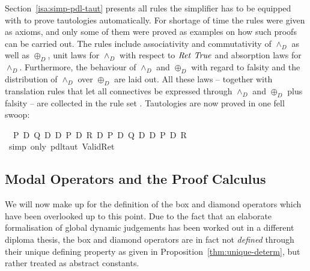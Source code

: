 Section~\ref{isa:simp-pdl-taut} presents all rules the simplifier has to be
equipped with to prove tautologies automatically. For shortage of time the rules
were given as axioms, and only some of them were proved as examples on how such
proofs can be carried out. The rules include associativity and commutativity of
$\land_D$ as well as $\oplus_D$, unit laws for $\land_D$ with respect to $\mathit{Ret}~\mathit{True}$ and
absorption laws for $\land_D$. Furthermore, the behaviour of $\land_D$ and $\oplus_D$ with
regard to falsity and the distribution of $\land_D$ over $\oplus_D$ are laid out.  All
these laws -- together with translation rules that let all connectives be
expressed through $\land_D$ and $\oplus_D$ plus falsity -- are collected in the rule set
. Tautologies are now proved in one fell swoop:
\begin{isabellebody}
\isanewline
{}\ {\isachardoublequote}{\isasymturnstile}\ {\isacharparenleft}P\ {\isasymlongrightarrow}\isactrlsub D\ Q{\isacharparenright}\ {\isasymand}\isactrlsub D\ {\isacharparenleft}{\isasymnot}\isactrlsub D\ P\ {\isasymlongrightarrow}\isactrlsub D\ R{\isacharparenright}\ {\isasymlongleftrightarrow}\isactrlsub D\ {\isacharparenleft}P\ {\isasymand}\isactrlsub D\ Q\ {\isasymor}\isactrlsub D\ {\isasymnot}\isactrlsub D\ P\ {\isasymand}\isactrlsub D\ R{\isacharparenright}{\isachardoublequote}\isanewline
\ \ \isamarkupfalse%
\ {\isacharparenleft}simp\ only{\isacharcolon}\ pdl{\isacharunderscore}taut\ Valid{\isacharunderscore}Ret{\isacharparenright}\isanewline
\end{isabellebody}


\subsection{Modal Operators and the Proof Calculus}
We will now make up for the definition of the box and diamond operators which
have been overlooked up to this point. Due to the fact that an elaborate
formalisation of global dynamic judgements has been worked out in a different
diploma thesis, the box and diamond operators are in fact not \emph{defined}
through their unique defining property as given in
Proposition~\ref{thm:unique-determ}, but rather treated as abstract constants.

